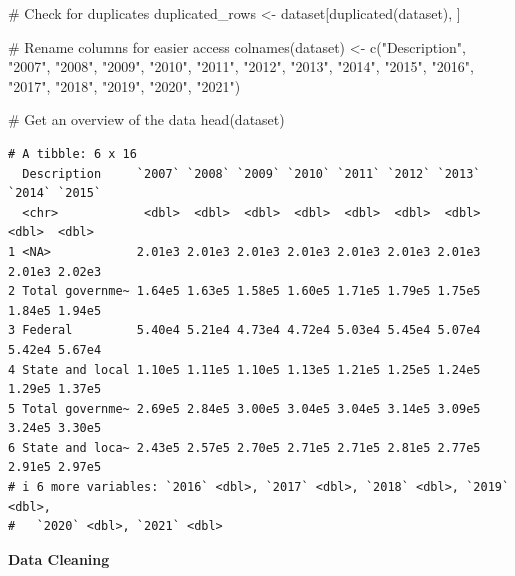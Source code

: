 \documentclass[
  letterpaper,
  DIV=11,
  numbers=noendperiod]{scrreprt}
\newenvironment{Shaded}{\begin{snugshade}}{\end{snugshade}}
\newcommand{\CommentTok}[1]{\textcolor[rgb]{0.37,0.37,0.37}{#1}}
\newcommand{\FunctionTok}[1]{\textcolor[rgb]{0.28,0.35,0.67}{#1}}
\newcommand{\NormalTok}[1]{\textcolor[rgb]{0.00,0.23,0.31}{#1}}
\newcommand{\OtherTok}[1]{\textcolor[rgb]{0.00,0.23,0.31}{#1}}
\newcommand{\StringTok}[1]{\textcolor[rgb]{0.13,0.47,0.30}{#1}}
\begin{document}
\begin{Shaded}
\begin{Highlighting}[]
\CommentTok{\# Check for duplicates}
\NormalTok{duplicated\_rows }\OtherTok{\textless{}{-}}\NormalTok{ dataset[}\FunctionTok{duplicated}\NormalTok{(dataset), ]}

\CommentTok{\# Rename columns for easier access}
\FunctionTok{colnames}\NormalTok{(dataset) }\OtherTok{\textless{}{-}} \FunctionTok{c}\NormalTok{(}\StringTok{"Description"}\NormalTok{, }\StringTok{"2007"}\NormalTok{, }\StringTok{"2008"}\NormalTok{, }\StringTok{"2009"}\NormalTok{, }\StringTok{"2010"}\NormalTok{, }\StringTok{"2011"}\NormalTok{, }
                       \StringTok{"2012"}\NormalTok{, }\StringTok{"2013"}\NormalTok{, }\StringTok{"2014"}\NormalTok{, }\StringTok{"2015"}\NormalTok{, }\StringTok{"2016"}\NormalTok{, }\StringTok{"2017"}\NormalTok{, }\StringTok{"2018"}\NormalTok{, }
                       \StringTok{"2019"}\NormalTok{, }\StringTok{"2020"}\NormalTok{, }\StringTok{"2021"}\NormalTok{)}

\CommentTok{\# Get an overview of the data}
\FunctionTok{head}\NormalTok{(dataset)}
\end{Highlighting}
\end{Shaded}

\begin{verbatim}
# A tibble: 6 x 16
  Description     `2007` `2008` `2009` `2010` `2011` `2012` `2013` `2014` `2015`
  <chr>            <dbl>  <dbl>  <dbl>  <dbl>  <dbl>  <dbl>  <dbl>  <dbl>  <dbl>
1 <NA>            2.01e3 2.01e3 2.01e3 2.01e3 2.01e3 2.01e3 2.01e3 2.01e3 2.02e3
2 Total governme~ 1.64e5 1.63e5 1.58e5 1.60e5 1.71e5 1.79e5 1.75e5 1.84e5 1.94e5
3 Federal         5.40e4 5.21e4 4.73e4 4.72e4 5.03e4 5.45e4 5.07e4 5.42e4 5.67e4
4 State and local 1.10e5 1.11e5 1.10e5 1.13e5 1.21e5 1.25e5 1.24e5 1.29e5 1.37e5
5 Total governme~ 2.69e5 2.84e5 3.00e5 3.04e5 3.04e5 3.14e5 3.09e5 3.24e5 3.30e5
6 State and loca~ 2.43e5 2.57e5 2.70e5 2.71e5 2.71e5 2.81e5 2.77e5 2.91e5 2.97e5
# i 6 more variables: `2016` <dbl>, `2017` <dbl>, `2018` <dbl>, `2019` <dbl>,
#   `2020` <dbl>, `2021` <dbl>
\end{verbatim}

\textbf{Data Cleaning}
\end{document}
